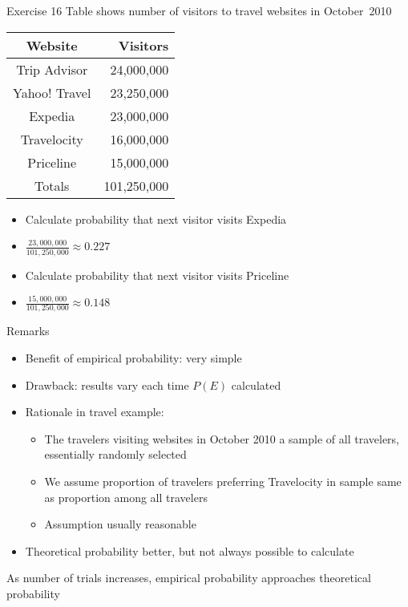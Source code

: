 \documentclass{beamer}
\theoremstyle{definition}
\begin{document}
\begin{frame}{Exercise 16}
Table shows number of visitors to travel websites in October~2010
\begin{center}\begin{tabular}{cr}
Website&Visitors\\\hline
Trip Advisor&24,000,000\\
Yahoo! Travel&23,250,000\\
Expedia&23,000,000\\
Travelocity&16,000,000\\
Priceline&15,000,000\\\hline
Totals&101,250,000
\end{tabular}\end{center}
\begin{itemize}
\item Calculate probability that next visitor visits Expedia
\item $\frac{23,000,000}{101,250,000}\approx 0.227$
\item Calculate probability that next visitor visits Priceline 
\item $\frac{15,000,000}{101,250,000}\approx 0.148$
\end{itemize}
\end{frame}

\begin{frame}{Remarks}
\begin{itemize}
\item Benefit of empirical probability: very simple
\item Drawback: results vary each time $P\left(E\right)$ calculated
\item Rationale in travel example:
\begin{itemize}
\item The travelers visiting websites in October 2010 a \alert{sample}
of all travelers, essentially \alert{randomly} selected
\item We assume proportion of travelers preferring Travelocity
in sample same as proportion among all travelers
\item Assumption usually reasonable
\end{itemize}
\item Theoretical probability better, but not always possible to calculate
\end{itemize}
\begin{theorem}
As number of trials increases, empirical probability
approaches theoretical probability
\end{theorem}
\end{frame}
\end{document}
